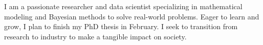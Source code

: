 I am a passionate researcher and data scientist specializing in
mathematical modeling and Bayesian methods to solve real-world
problems. Eager to learn and grow, I plan to finish my PhD thesis in
February. I seek to transition from research to industry to make a
tangible impact on society. \\
